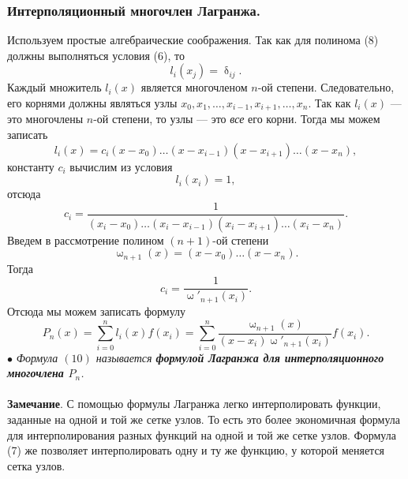 \documentclass[a4paper, 12pt]{report}
\numberwithin{equation}{section}
\renewcommand{\delta}{\updelta}
\renewcommand{\omega}{\upomega}
\begin{document}
	\subsubsection{Интерполяционный многочлен Лагранжа.}
	Используем простые алгебраические соображения. Так как для полинома (8) должны выполняться условия (6), то $$l_i(x_j) = \delta_{ij}.$$
	Каждый множитель $l_i(x)$ является многочленом $n$-ой степени. Следовательно, его корнями должны являться узлы $x_0,x_1,\ldots, x_{i-1}, x_{i+1},\ldots, x_n$. Так как $l_i(x)$ --- это многочлены $n$-ой степени, то узлы --- это \textit{все} его корни. Тогда мы можем записать $$l_i(x) = c_i(x-x_0)\ldots(x-x_{i-1})(x-x_{i+1})\ldots (x-x_n),$$
	константу $c_i$ вычислим из условия $$l_i(x_i) = 1,$$ отсюда $$c_i = \dfrac{1}{(x_i - x_0)\ldots (x_i - x_{i-1})(x_i - x_{i+1})\ldots (x_i-x_n)}.$$
	Введем в рассмотрение полином $(n+1)$-ой степени \begin{equation}
		\omega_{n+1}(x) = (x-x_0)\ldots (x-x_n).
	\end{equation}
	Тогда $$c_i = \dfrac{1}{\omega'_{n+1}(x_i)}.$$
	Отсюда мы можем записать формулу 
	\begin{equation}
		P_n(x) = \sum_{i=0}^{n}l_i(x)f(x_i) = \sum_{i=0}^{n}\dfrac{\omega_{n+1}(x)}{(x-x_i)\omega'_{n+1}(x_i)}f(x_i).
	\end{equation}
	$\bullet$ \textit{Формула $(10)$ называется \textbf{формулой Лагранжа для интерполяционного многочлена $P_n$}.}\\\\
	\textbf{Замечание}. С помощью формулы Лагранжа легко интерполировать функции, заданные на одной и той же сетке узлов. То есть это более экономичная формула для интерполирования разных функций на одной и той же сетке узлов. Формула (7) же позволяет интерполировать одну и ту же функцию, у которой меняется сетка узлов.
\end{document}
